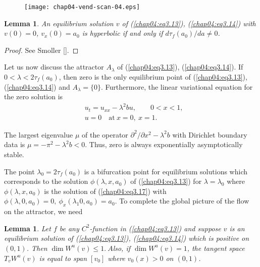\documentclass{surv-l}
\theoremstyle{plain}
\newtheorem{lemma}[theorem]{Lemma}
\theoremstyle{definition}
\numberwithin{equation}{section}
\numberwithin{figure}{chapter}
\begin{document}
\begin{figure}
\texttt{[image: chap04-vend-scan-04.eps]}
\caption{}\label{fig3.3}
\end{figure}

\begin{lemma}\label{lem4.3.8} An equilibrium solution $v$ of \emph{(\ref{chap04:eq3.13})}, \emph{(\ref{chap04:eq3.14})} with $v(0)=0$, $v_{x}(0)=a_{0}$ is hyperbolic if and only if $d\tau_{f}(a_{0})/da\neq 0$.
\end{lemma}

\begin{proof} See Smoller [\citeyear{1983s}].
\end{proof}

Let us now discuss the attractor $A_{\lambda}$ of (\ref{chap04:eq3.13}), (\ref{chap04:eq3.14}). If $ 0<\lambda <2\tau_{f}(a_{0})$, then zero is the only equilibrium point of (\ref{chap04:eq3.13}), (\ref{chap04:eq3.14}) and $A_{\lambda}=\{0\}$. Furthermore, the linear variational equation for the zero solution is
\begin{align*}
&u_{t}=u_{xx}-\lambda^{2}bu,\qquad 0<x<1,\\
&u=0\quad \mathrm{at}\ x=0,\ x=1.
\end{align*}

The largest eigenvalue $\mu$ of the operator $\partial^{2}/\partial x^{2}-\lambda^{2}b$ with Dirichlet boundary data is $\mu=-\pi^{2}-\lambda^{2}b<0$. Thus, zero is always exponentially asymptotically stable.

The point $\lambda_{0}=2\tau_{f}(a_{0})$ is a bifurcation point for equilibrium solutions which corresponds to the solution $\phi(\lambda, x, a_{0})$ of (\ref{chap04:eq3.13}) for $\lambda =\lambda_{0}$ where $\phi(\lambda, x, a_{0})$ is the solution of (\ref{chap04:eq3.17}) with $\phi(\lambda, 0, a_{0})=0,\ \phi_{x}(\lambda_{1}0, a_{0})=a_{0}$. To complete the global picture of the flow on the attractor, we need

\begin{lemma}\label{lem4.3.9} Let $f$ be any $C^{2}$-function in \emph{(\ref{chap04:eq3.13})} and suppose $v$ is an equilibrium solution of \emph{(\ref{chap04:eq3.13})}, \emph{(\ref{chap04:eq3.14})} which is positive on $(0,1)$. Then $\dim W^{u}(v)\leq 1.\ A$lso, if $\dim W^{u}(v)=1$, the tangent space $T_{v}W^{u}(v)$ is equal to span $[v_{0}]$ where $v_{0}(x)>0$ on $(0,1)$.
\end{lemma}
\end{document}
